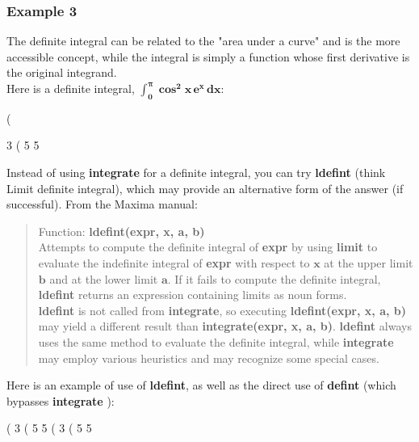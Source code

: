 \documentclass[12pt]{article}
\newcommand{\tcbr}{\textcolor{BrickRed}}
\begin{document}
\subsubsection*{Example 3}
The \tcbr{definite} integral can be related to the "area under a curve" and is the more
  accessible concept, while the \tcbr{} integral is simply a function whose first derivative
  is the original integrand.\\

\noindent Here is a \tcbr{definite} integral,
     $\mathbf{\int_{0}^{\pi} \boldsymbol{\cos}^2 x \, e^{x} \,dx}$:
\begin{myVerbatim}
(%

                                  3 %
(%
                                     5      5
\end{myVerbatim} 
Instead of using \textbf{integrate} for a definite integral, you 
  can try \textbf{ldefint} (think Limit definite integral), which may
  provide an alternative form of the answer (if successful).
\newpage
From the Maxima manual:
\small
\begin{quote}
Function: \textbf{ldefint(expr, x, a, b)}\\
Attempts to compute the definite integral of \textbf{expr} by using \textbf{limit} to evaluate
  the indefinite integral of \textbf{expr} with respect to $\mathbf{x}$ at the
  upper limit $\mathbf{b}$ and at the lower limit $\mathbf{a}$.
If it fails to compute the definite integral, \textbf{ldefint} returns
  an expression containing limits as noun forms.\\
  
\textbf{ldefint} is not called from \textbf{integrate}, so executing
  \textbf{ldefint(expr, x, a, b)} may yield a different result
   than \textbf{integrate(expr, x, a, b)}.
\textbf{ldefint} always uses the same method to evaluate the
   definite integral, while \textbf{integrate} may employ various
   heuristics and may recognize some special cases.
\end{quote}
\normalsize
\noindent Here is an example of use of \textbf{ldefint}, as well as the direct use
  of \textbf{defint} (which bypasses \textbf{integrate} ):
\begin{myVerbatim}
(%
                                  3 %
(%
                                     5      5
(%
                                  3 %
(%
                                     5      5
\end{myVerbatim} 
\end{document}
